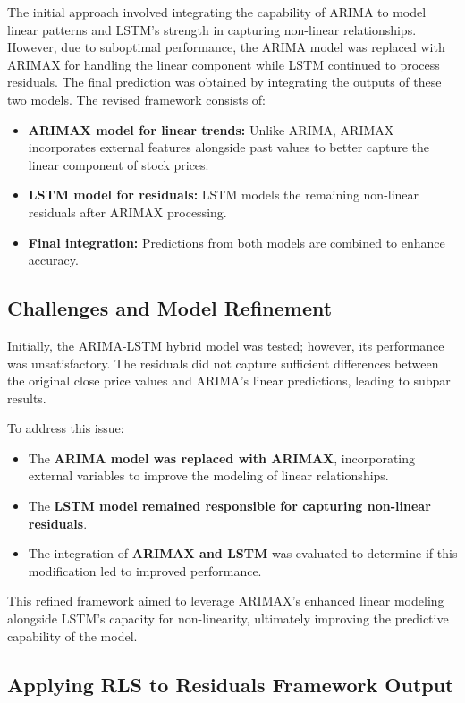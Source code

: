 The initial approach involved integrating the capability of ARIMA to model linear patterns and LSTM's strength in capturing non-linear relationships. However, due to suboptimal performance, the ARIMA model was replaced with ARIMAX for handling the linear component while LSTM continued to process residuals. The final prediction was obtained by integrating the outputs of these two models. The revised framework consists of:

\begin{itemize}
    \item \textbf{ARIMAX model for linear trends:} Unlike ARIMA, ARIMAX incorporates external features alongside past values to better capture the linear component of stock prices.
    \item \textbf{LSTM model for residuals:} LSTM models the remaining non-linear residuals after ARIMAX processing.
    \item \textbf{Final integration:} Predictions from both models are combined to enhance accuracy.
\end{itemize}

\subsection{Challenges and Model Refinement}

Initially, the ARIMA-LSTM hybrid model was tested; however, its performance was unsatisfactory. The residuals did not capture sufficient differences between the original close price values and ARIMA’s linear predictions, leading to subpar results. 

To address this issue:
\begin{itemize}
    \item The \textbf{ARIMA model was replaced with ARIMAX}, incorporating external variables to improve the modeling of linear relationships.
    \item The \textbf{LSTM model remained responsible for capturing non-linear residuals}.
    \item The integration of \textbf{ARIMAX and LSTM} was evaluated to determine if this modification led to improved performance.
\end{itemize}

This refined framework aimed to leverage ARIMAX's enhanced linear modeling alongside LSTM's capacity for non-linearity, ultimately improving the predictive capability of the model.

\subsection{Applying RLS to Residuals Framework Output}

